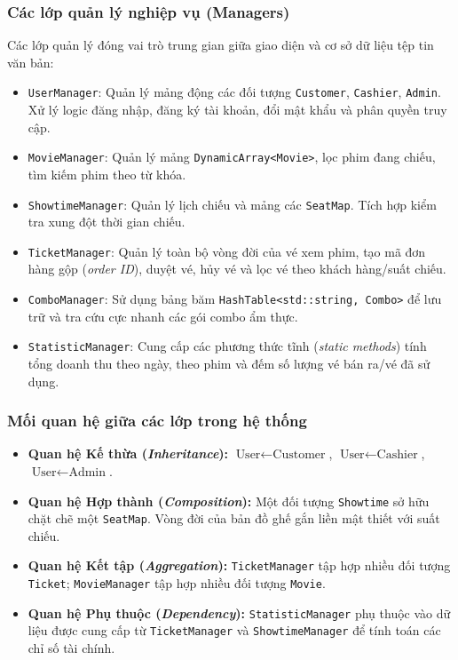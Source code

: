\documentclass[12pt,a4paper]{article}
\begin{document}
\subsubsection{Các lớp quản lý nghiệp vụ (Managers)}
Các lớp quản lý đóng vai trò trung gian giữa giao diện và cơ sở dữ liệu tệp tin văn bản:
\begin{itemize}
    \item \texttt{UserManager}: Quản lý mảng động các đối tượng \texttt{Customer}, \texttt{Cashier}, \texttt{Admin}. Xử lý logic đăng nhập, đăng ký tài khoản, đổi mật khẩu và phân quyền truy cập.
    \item \texttt{MovieManager}: Quản lý mảng \texttt{DynamicArray<Movie>}, lọc phim đang chiếu, tìm kiếm phim theo từ khóa.
    \item \texttt{ShowtimeManager}: Quản lý lịch chiếu và mảng các \texttt{SeatMap}. Tích hợp kiểm tra xung đột thời gian chiếu.
    \item \texttt{TicketManager}: Quản lý toàn bộ vòng đời của vé xem phim, tạo mã đơn hàng gộp (\textit{order ID}), duyệt vé, hủy vé và lọc vé theo khách hàng/suất chiếu.
    \item \texttt{ComboManager}: Sử dụng bảng băm \texttt{HashTable<std::string, Combo>} để lưu trữ và tra cứu cực nhanh các gói combo ẩm thực.
    \item \texttt{StatisticManager}: Cung cấp các phương thức tĩnh (\textit{static methods}) tính tổng doanh thu theo ngày, theo phim và đếm số lượng vé bán ra/vé đã sử dụng.
\end{itemize}

\subsubsection{Mối quan hệ giữa các lớp trong hệ thống}
\begin{itemize}
    \item \textbf{Quan hệ Kế thừa (\textit{Inheritance}):} $\text{User} \leftarrow \text{Customer}$, $\text{User} \leftarrow \text{Cashier}$, $\text{User} \leftarrow \text{Admin}$.
    \item \textbf{Quan hệ Hợp thành (\textit{Composition}):} Một đối tượng \texttt{Showtime} sở hữu chặt chẽ một \texttt{SeatMap}. Vòng đời của bản đồ ghế gắn liền mật thiết với suất chiếu.
    \item \textbf{Quan hệ Kết tập (\textit{Aggregation}):} \texttt{TicketManager} tập hợp nhiều đối tượng \texttt{Ticket}; \texttt{MovieManager} tập hợp nhiều đối tượng \texttt{Movie}.
    \item \textbf{Quan hệ Phụ thuộc (\textit{Dependency}):} \texttt{StatisticManager} phụ thuộc vào dữ liệu được cung cấp từ \texttt{TicketManager} và \texttt{ShowtimeManager} để tính toán các chỉ số tài chính.
\end{itemize}
\end{document}
